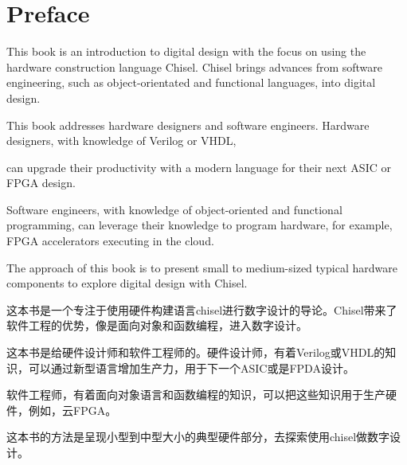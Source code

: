 \documentclass[%
    10pt,
    headinclude, footexclude,
    openright, %
    notitlepage,
    cleardoubleempty,
    headsepline,
    pointlessnumbers,
    bibtotoc, idxtotoc,
    ]{scrbook}
\begin{document}
\chapter{Preface}


This book is an introduction to digital design with the focus on using the hardware construction language Chisel. Chisel brings advances from software engineering, such as object-orientated and functional languages, into digital design.

This book addresses hardware designers and software engineers. Hardware designers, with knowledge of Verilog or VHDL, 

can upgrade their productivity with a modern language for their next ASIC or FPGA design. 

Software engineers, with knowledge of object-oriented and functional programming, can leverage their knowledge to program hardware, for example, FPGA accelerators executing in the cloud.

The approach of this book is to present small to medium-sized typical hardware components to explore digital design with Chisel.

这本书是一个专注于使用硬件构建语言chisel进行数字设计的导论。Chisel带来了软件工程的优势，像是面向对象和函数编程，进入数字设计。

这本书是给硬件设计师和软件工程师的。硬件设计师，有着Verilog或VHDL的知识，可以通过新型语言增加生产力，用于下一个ASIC或是FPDA设计。

软件工程师，有着面向对象语言和函数编程的知识，可以把这些知识用于生产硬件，例如，云FPGA。

这本书的方法是呈现小型到中型大小的典型硬件部分，去探索使用chisel做数字设计。




\end{document}
